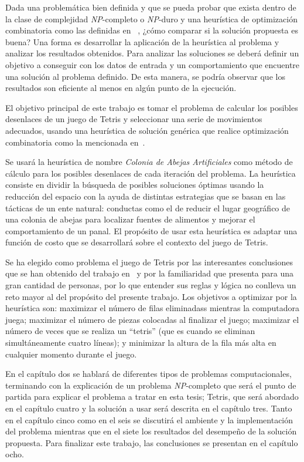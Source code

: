 Dada una problemática bien definida y que se pueda probar que exista 
dentro de la clase de complejidad
\textsl{NP}-completo o \textsl{NP}-duro y una heurística de optimización
combinatoria como las definidas en ~\cite{Pearl1984}, ¿cómo comparar si la
solución propuesta es buena?  Una forma es desarrollar la aplicación de la
heurística al problema y analizar los resultados obtenidos. Para analizar las
soluciones se deberá definir un objetivo a conseguir con los 
datos de entrada y un comportamiento que encuentre una solución 
al problema definido. De esta manera, se podría observar que los resultados son
eficiente al menos en algún punto de la ejecución.

El objetivo principal de este trabajo es tomar el problema de calcular los
posibles desenlaces de un juego de Tetris y seleccionar una serie de
movimientos adecuados, usando una heurística de solución genérica que realice
optimización combinatoria como la mencionada en~\cite{karaboga2005idea}.

Se usará la heurística de nombre \textit{Colonia de Abejas Artificiales} como
método de cálculo para los posibles desenlaces de cada iteración del problema.
La heurística consiste en dividir la búsqueda de posibles soluciones óptimas
usando la reducción del espacio con la ayuda de distintas estrategias que se
basan en las tácticas de un ente natural: conductas como el de
reducir el lugar geográfico de una colonia de abejas para localizar fuentes
de alimentos y mejorar el comportamiento de un panal.
El propósito de usar esta heurística es adaptar una función de costo que
se desarrollará sobre el contexto del juego de Tetris.

Se ha elegido como problema el juego de Tetris por las interesantes
conclusiones que se han obtenido del trabajo
en~\cite{DBLP:journals/corr/cs-CC-0210020} y por
la familiaridad que presenta para una gran cantidad de personas, por lo que
entender sus reglas y lógica no conlleva un reto mayor al del propósito del
presente trabajo. Los objetivos a optimizar por la heurística son: maximizar
el número de filas eliminadass mientras la computadora juega; maximizar el
número de piezas colocadas al finalizar el juego; maximizar el número de veces
que se realiza un ``tetris'' (que es cuando se eliminan simultáneamente cuatro
líneas); y minimizar la altura de la fila más alta en cualquier momento
durante el juego.

En el capítulo dos se hablará de diferentes tipos de problemas computacionales,
terminando con la explicación de un problema \textsl{NP}-completo que será el
punto de partida para explicar el problema a tratar en esta tesis;
Tetris, que será abordado en el capítulo cuatro y la solución a usar
será descrita en el capítulo tres. Tanto en el capítulo cinco como en el seis se
discutirá el ambiente y la implementación del problema mientras que en el siete
los resultados del desempeño de la solución propuesta. Para finalizar este
trabajo, las conclusiones se presentan en el capítulo ocho.

